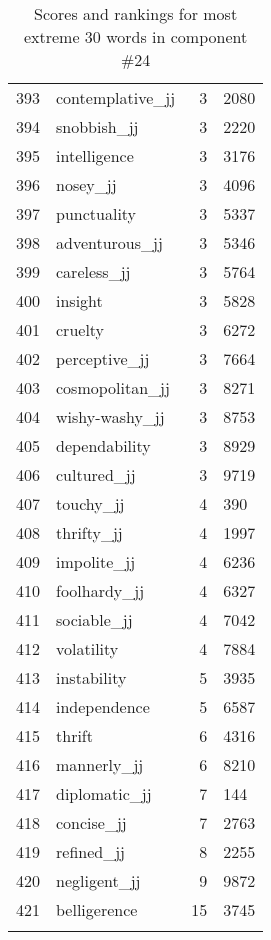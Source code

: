 \begin{longtable}[!htbp]{| rlr@{.}l |}
    393 & contemplative\_jj & 3 & 2080 \\
    394 & snobbish\_jj & 3 & 2220 \\
    395 & intelligence & 3 & 3176 \\
    396 & nosey\_jj & 3 & 4096 \\
    397 & punctuality & 3 & 5337 \\
    398 & adventurous\_jj & 3 & 5346 \\
    399 & careless\_jj & 3 & 5764 \\
    400 & insight & 3 & 5828 \\
    401 & cruelty & 3 & 6272 \\
    402 & perceptive\_jj & 3 & 7664 \\
    403 & cosmopolitan\_jj & 3 & 8271 \\
    404 & wishy-washy\_jj & 3 & 8753 \\
    405 & dependability & 3 & 8929 \\
    406 & cultured\_jj & 3 & 9719 \\
    407 & touchy\_jj & 4 & 390 \\
    408 & thrifty\_jj & 4 & 1997 \\
    409 & impolite\_jj & 4 & 6236 \\
    410 & foolhardy\_jj & 4 & 6327 \\
    411 & sociable\_jj & 4 & 7042 \\
    412 & volatility & 4 & 7884 \\
    413 & instability & 5 & 3935 \\
    414 & independence & 5 & 6587 \\
    415 & thrift & 6 & 4316 \\
    416 & mannerly\_jj & 6 & 8210 \\
    417 & diplomatic\_jj & 7 & 144 \\
    418 & concise\_jj & 7 & 2763 \\
    419 & refined\_jj & 8 & 2255 \\
    420 & negligent\_jj & 9 & 9872 \\
    421 & belligerence & 15 & 3745 \\
    \hline
    \caption{Scores and rankings for most extreme 30 words in component \#24} \\
\end{longtable}
